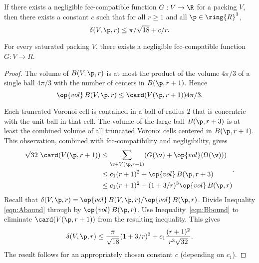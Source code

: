 \begin{lemma}
\label{lemma:deltabound} If there exists a %
negligible  fcc-compatible function%
$G: V\to\R$ for a 
packing $ V$, then there
exists a constant $c$ such that for all $r\ge1$ and all
$\p\in\ring{R}^3$,
\begin{displaymath}
\delta( V,\p,r)
\le \pi/\sqrt{18} + c/r.
\end{displaymath}
\end{lemma}

\begin{conjecture}\label{conj:fcc-neg}
For every saturated packing $ V$, there exists a negligible
fcc-compatible function $G: V\to R$.
\end{conjecture}



\begin{proof}
The volume of $B( V,\p,r)$ is at most the product of the volume
$4\pi/3$ of a single ball $4\pi/3$ with the number of centers in
$B(\p,r+1)$.  Hence
\begin{equation}
\op{vol}\, B( V,\p,r) \le \card( V(\p,r+1)) 4\pi/3.
\label{eqn:Abound}
\end{equation}

Each truncated Voronoi cell is contained in a ball of
radius $2$ that is concentric with the unit ball in that cell.  The volume
of the large ball $B(\p,r+3)$ is at least the combined volume of 
all truncated Voronoi
cells centered in $B(\p,r+1)$. This observation,
combined with fcc-compatibility and negligibility, gives
\begin{equation}
\begin{split}
\sqrt{32}\,\,\card( V(\p,r+1))
&\le \sum_{\v\in V(\p,r+1)} (G(\v) +
\op{vol}(\Omega(\v))) \\
&\le c_1 (r+1)^2 + \op{vol}\,B(\p,r+3) \\
&\le c_1 (r+1)^2 + (1+3/r)^3 \op{vol}\,B(\p,r)
\label{eqn:Bbound}
\end{split}.
\end{equation}
%
Recall that $\delta( V,\p,r)=
\op{vol}\,B( V,\p,r)/\op{vol}\,B(\p,r)$. Divide Inequality
\ref{eqn:Abound} through by $\op{vol}\,B(\p,r)$.  Use
Inequality~\ref{eqn:Bbound} to eliminate $\card( V(\p,r+1))$ from the
resulting inequality.  This gives
\begin{displaymath}\delta( V,\p,r)
\le \frac{\pi}{\sqrt{18}} (1+3/r)^3 + c_1 \frac{(r+1)^2}{r^3\sqrt{32}}.
\end{displaymath}
The result follows for an appropriately chosen constant $c$
(depending on $c_1$).
\end{proof}

